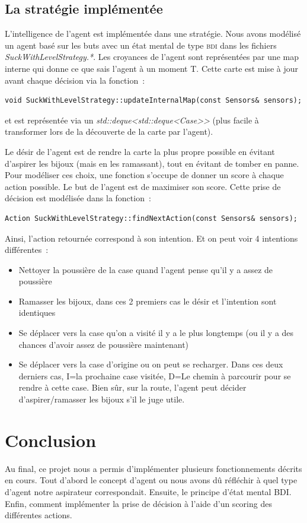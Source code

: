 \documentclass{article}
\begin{document}
\subsection{La stratégie implémentée}
L'intelligence de l'agent est implémentée dans une stratégie. Nous avons modélisé un agent basé sur les buts avec un état mental de type \textsc{bdi} dans les fichiers \emph{SuckWithLevelStrategy.*}. Les croyances de l'agent sont représentées par une map interne qui donne ce que sais l'agent à un moment T. Cette carte est mise à jour avant chaque décision via la fonction~:
\begin{verbatim}
void SuckWithLevelStrategy::updateInternalMap(const Sensors& sensors);
\end{verbatim}
et est représentée via un \emph{std::deque<std::deque<Case>>} (plus facile à transformer lors de la découverte de la carte par l'agent).

Le désir de l'agent est de rendre la carte la plus propre possible en évitant d'aspirer les bijoux (mais en les ramassant), tout en évitant de tomber en panne. Pour modéliser ces choix, une fonction s'occupe de donner un score à chaque action possible. Le but de l'agent est de maximiser son score. Cette prise de décision est modélisée dans la fonction~:
\begin{verbatim}
Action SuckWithLevelStrategy::findNextAction(const Sensors& sensors);
\end{verbatim}
Ainsi, l'action retournée correspond à son intention. Et on peut voir 4 intentions différentes~:
\begin{itemize}
    \item Nettoyer la poussière de la case quand l'agent pense qu'il y a assez de poussière
    \item Ramasser les bijoux, dans ces 2 premiers cas le désir et l'intention sont identiques
    \item Se déplacer vers la case qu'on a visité il y a le plus longtemps (ou il y a des chances d'avoir assez de poussière maintenant)
    \item Se déplacer vers la case d'origine ou on peut se recharger. Dans ces deux derniers cas, I=la prochaine case visitée, D=Le chemin à parcourir pour se rendre à cette case. Bien sûr, sur la route, l'agent peut décider d'aspirer/ramasser les bijoux s'il le juge utile.
\end{itemize}

\section{Conclusion}
Au final, ce projet nous a permis d'implémenter plusieurs fonctionnements décrits en cours. Tout d'abord le concept d'agent ou nous avons dû réfléchir à quel type d'agent notre aspirateur correspondait. Ensuite, le principe d'état mental BDI. Enfin, comment implémenter la prise de décision à l'aide d'un scoring des différentes actions.
\end{document}
